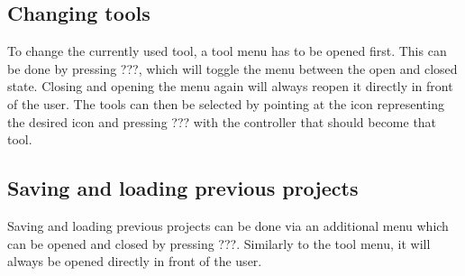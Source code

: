 
\subsection*{Changing tools}
To change the currently used tool, a tool menu has to be opened first. This can be done by pressing ???, which will toggle the menu between the open and closed state. Closing and opening the menu again will always reopen it directly in front of the user. The tools can then be selected by pointing at the icon representing the desired icon and pressing ??? with the controller that should become that tool.

\subsection*{Saving and loading previous projects}
Saving and loading previous projects can be done via an additional menu which can be opened and closed by pressing ???. Similarly to the tool menu, it will always be opened directly in front of the user.

